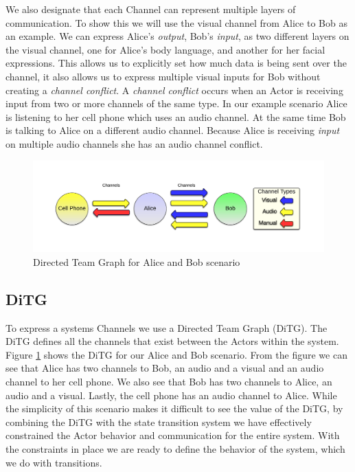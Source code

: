 We also designate that each Channel can represent multiple layers of communication.  To show this we will use the visual channel from Alice to Bob as an example.  We can express Alice's {\em output}, Bob's {\em input}, as two different layers on the visual channel, one for Alice's body language, and another for her facial expressions.  This allows us to explicitly set how much data is being sent over the channel, it also allows us to express multiple visual inputs for Bob without creating a {\em channel conflict}.  A {\em channel conflict} occurs when an Actor is receiving input from two or more channels of the same type.  In our example scenario Alice is listening to her cell phone which uses an audio channel.  At the same time Bob is talking to Alice on a different audio channel.  Because Alice is receiving {\em input} on multiple audio channels she has an audio channel conflict.  

\begin{figure}[h]
\begin{center}
\includegraphics[width=\textwidth]{ab_ditg.png}
\caption{Directed Team Graph for Alice and Bob scenario}
\label{fig:ab_ditg}
\end{center}
\end{figure}

\subsection{DiTG}
To express a systems Channels we use a Directed Team Graph (DiTG)\cite{moore2014modeling}.  The DiTG defines all the channels that exist between the Actors within the system.  Figure \ref{fig:ab_ditg} shows the DiTG for our Alice and Bob scenario.  From the figure we can see that Alice has two channels to Bob, an audio and a visual and an audio channel to her cell phone.  We also see that Bob has two channels to Alice, an audio and a visual.  Lastly, the cell phone has an audio channel to Alice.  While the simplicity of this scenario makes it difficult to see the value of the DiTG, by combining the DiTG with the state transition system we have effectively constrained the Actor behavior and communication for the entire system.  With the constraints in place we are ready to define the behavior of the system, which we do with transitions.


